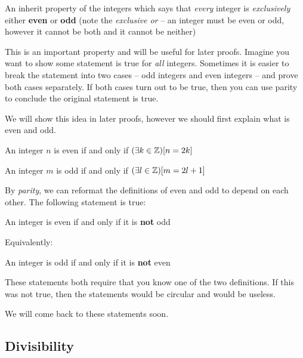 \documentclass[main.tex]{subfiles}
\begin{document}
\begin{defn}
	An inherit property of the integers which says that \textit{every} integer is \textit{exclusively} either \textbf{even} or \textbf{odd} (note the \textit{exclusive or} -- an integer must be even or odd, however it cannot be both and it cannot be neither)
\end{defn}

This is an important property and will be useful for later proofs. Imagine you want to show some statement is true for \textit{all} integers. Sometimes it is easier to break the statement into two cases -- odd integers and even integers -- and prove both cases separately. If both cases turn out to be true, then you can use parity to conclude the original statement is true.

We will show this idea in later proofs, however we should first explain what is even and odd.

\begin{defn}
	An integer \(n\) is even if and only if \((\exists k \in \mathbb{Z})[n = 2k]\)
\end{defn}

\begin{defn}
	An integer \(m\) is odd if and only if \((\exists l \in \mathbb{Z})[m = 2l + 1]\)
\end{defn}

By \textit{parity}, we can reformat the definitions of even and odd to depend on each other. The following statement is true:

\begin{center}
	An integer is even if and only if it is \textbf{not} odd
\end{center}

Equivalently:

\begin{center}
	An integer is odd if and only if it is \textbf{not} even
\end{center}

These statements both require that you know one of the two definitions. If this was not true, then the statements would be circular and would be useless.

We will come back to these statements soon.

\subsection{Divisibility}
\end{document}
